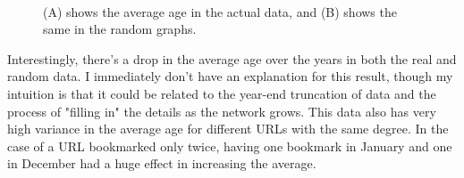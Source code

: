 \documentclass[11pt]{amsart}
\begin{document}
\begin{figure}
	\centering
	 \\
\caption{(A) shows the average age in the actual data, and (B) shows the same in the random graphs.}
\end{figure}

Interestingly, there's a drop in the average age over the years in both the real and random data. I immediately don't have an explanation for this result, though my intuition is that it could be related to the year-end truncation of data and the process of "filling in" the details as the network grows. This data also has very high variance in the average age for different URLs with the same degree. In the case of a URL bookmarked only twice, having one bookmark in January and one in December had a huge effect in increasing the average.
\end{document}
